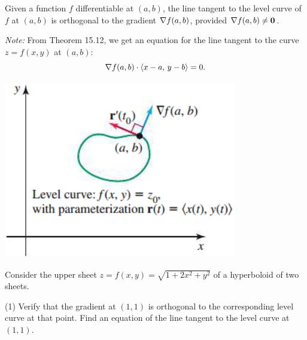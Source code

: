 \documentclass[mathNotesPreamble]{subfiles}
\begin{document}
  \begin{thmBox*}
    Given a function $f$ differentiable at $(a,b)$, the line tangent to the level curve of $f$ at $(a,b)$ is orthogonal to the gradient $\nabla f(a,b)$, provided $\nabla f(a,b)\neq \mathbf{0}$.
  \end{thmBox*}

  \noindent
  \begin{minipage}{0.6\linewidth}

    \textit{Note:} From Theorem 15.12, we get an equation for the line tangent to the curve $z=f(x,y)$ at $(a,b)$:
      \[\nabla f(a,b)\cdot{\left\langle x-a,\,y-b \right\rangle}=0.\]
  \end{minipage}%
  \begin{minipage}{0.3\linewidth}
    \begin{flushright}
      \includegraphics[width=\linewidth]{images/briggs_15_05/fig15_53}
    \end{flushright}
  \end{minipage}

  \begin{ex*}
    Consider the upper sheet $z=f(x,y)=\sqrt{1+2x^2+y^2}$ of a hyperboloid of two sheets.
  \end{ex*}
  \begin{tasks}[after-item-skip=\stretch{1}, label=](1)
    \task Verify that the gradient at $(1,1)$ is orthogonal to the corresponding level curve at that point.
    \task Find an equation of the line tangent to the level curve at $(1,1)$.
  \end{tasks}
  \pagebreak
\end{document}
